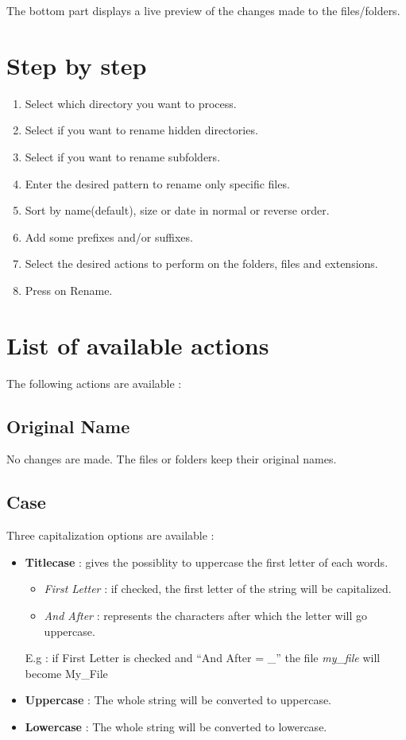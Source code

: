 \documentclass[10pt, a4paper]{scrartcl}
\begin{document}
The bottom part displays a live preview of the changes made to the files/folders.


\section{Step by step}
\begin{enumerate}
        \item Select which directory you want to process.
        \item Select if you want to rename hidden directories.
        \item Select if you want to rename subfolders.
        \item Enter the desired pattern to rename only specific files.
        \item Sort by name(default), size or date in normal or reverse order.
        \item Add some prefixes and/or suffixes.
        \item Select the desired actions to perform on the folders, files and extensions.
        \item Press on Rename.
\end{enumerate}

\section{List of available actions}
The following actions are available :

\subsection*{Original Name}
No changes are made. The files or folders keep their original names.

\subsection*{Case}
Three capitalization options are available :
\begin{itemize}
        \item \textbf{Titlecase} : gives the possiblity to uppercase the first letter of each words.
                \begin{itemize}
                        \item \emph{First Letter} : if checked, the first letter of the string will be capitalized. 
                        \item \emph{And After} : represents the characters after which the letter will go uppercase. 
                \end{itemize}
                E.g : if First Letter is checked and ``And After = \_'' the file \emph{my\_file} will become My\_File
        \item \textbf{Uppercase} : The whole string will be converted to uppercase.
        \item \textbf{Lowercase} : The whole string will be converted to lowercase.
\end{itemize}
\end{document}
